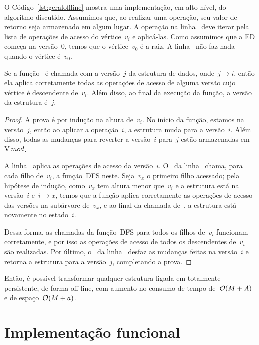 \documentclass[main.tex]{subfiles}
\begin{document}
O Código~\ref{lst:geraloffline} mostra uma implementação, em alto nível, do algoritmo discutido. Assumimos que, ao realizar uma operação, seu valor de retorno seja armazenado em algum lugar. A operação na linha~ deve iterar pela lista de operações de acesso do vértice~$v_i$ e aplicá-las. Como assumimos que a ED começa na versão~0, temos que o vértice~$v_0$ é a raiz. A linha~ não faz nada quando o vértice é~$v_0$.

\begin{proposition}
	Se a função~{\normalfont {}} é chamada com a versão~$j$ da estrutura de dados, onde~${j \rightarrow i}$, então ela aplica corretamente todas as operações de acesso de alguma versão cujo vértice é descendente de~$v_i$. Além disso, ao final da execução da função, a versão da estrutura é~$j$.
\end{proposition}

\begin{proof}
A prova é por indução na altura de~$v_i$. No início da função, estamos na versão~$j$, então ao aplicar a operação~$i$, a estrutura muda para a versão~$i$. Além disso, todas as mudanças para reverter a versão~$i$ para~$j$ estão armazenadas em~$\operatorname{V}{mod}$.

A linha~ aplica as operações de acesso da versão~$i$. O~ da linha~ chama, para cada filho de~$v_i$, a função~\textsc{DFS} neste. Seja~$v_x$ o primeiro filho acessado; pela hipótese de indução, como~$v_x$ tem altura menor que~$v_i$ e a estrutura está na versão~$i$ e~${i \rightarrow x}$, temos que a função aplica corretamente as operações de acesso das versões na subárvore de~$v_x$, e ao final da chamada de~, a estrutura está novamente no estado~$i$.

Dessa forma, as chamadas da função~\textsc{DFS} para todos os filhos de~$v_i$ funcionam corretamente, e por isso as operações de acesso de todos os descendentes de~$v_i$ são realizadas. Por último, o~ da linha~ desfaz as mudanças feitas na versão~$i$ e retorna a estrutura para a versão~$j$, completando a prova.
\end{proof}

Então, é possível transformar qualquer estrutura ligada em totalmente persistente, de forma off-line, com aumento no consumo de tempo de~$\mathcal{O}(M+A)$ e de espaço~$\mathcal{O}(M + a)$.

\section{Implementação funcional} \label{sec:implfuncional}
\end{document}

